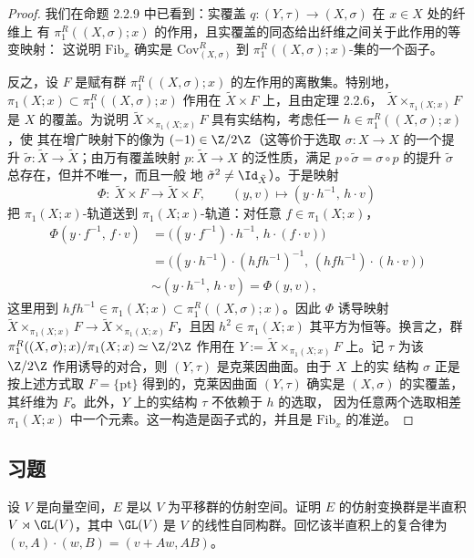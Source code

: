 \begin{proof}
我们在命题 2.2.9 中已看到：实覆盖 $q:(Y,\tau)\to(X,\sigma)$ 在 $x\in X$ 处的纤维上
有 $\pi^R_1((X,\sigma);x)$ 的作用，且实覆盖的同态给出纤维之间关于此作用的等变映射：
这说明 $\mathrm{Fib}_x$ 确实是 $\mathrm{Cov}^R_{(X,\sigma)}$ 到
$\pi^R_1((X,\sigma);x)$-集的一个函子。

反之，设 $F$ 是赋有群 $\pi^R_1((X,\sigma);x)$ 的左作用的离散集。特别地，
$\pi_1(X;x)\subset\pi^R_1((X,\sigma);x)$ 作用在 $\tilde X\times F$ 上，且由定理 2.2.6，
$\tilde X\times_{\pi_1(X;x)}F$ 是 $X$ 的覆盖。为说明
$\tilde X\times_{\pi_1(X;x)}F$ 具有实结构，考虑任一 $h\in\pi^R_1((X,\sigma);x)$，使
其在增广映射下的像为 $(-1)\in\Z/2\Z$（这等价于选取 $\sigma:X\to X$ 的一个提升
$\tilde\sigma:\tilde X\to\tilde X$；由万有覆盖映射 $p:\tilde X\to X$ 的泛性质，满足
$p\circ\tilde\sigma=\sigma\circ p$ 的提升 $\tilde\sigma$ 总存在，但并不唯一，而且一般
地 $\tilde\sigma^2\ne\Id_{\tilde X}$）。于是映射
\[
\Phi:\ \tilde X\times F\longrightarrow\tilde X\times F,
\qquad (y,v)\longmapsto(y\cdot h^{-1},\,h\cdot v)
\]
把 $\pi_1(X;x)$-轨道送到 $\pi_1(X;x)$-轨道：对任意 $f\in\pi_1(X;x)$，
\[
\begin{aligned}
\Phi(y\cdot f^{-1},\,f\cdot v)
&=\bigl((y\cdot f^{-1})\cdot h^{-1},\,h\cdot(f\cdot v)\bigr)\\
&=\bigl((y\cdot h^{-1})\cdot(hfh^{-1})^{-1},\,(hfh^{-1})\cdot(h\cdot v)\bigr)\\
&\sim(y\cdot h^{-1},\,h\cdot v)=\Phi(y,v),
\end{aligned}
\]
这里用到 $hfh^{-1}\in\pi_1(X;x)\subset\pi^R_1((X,\sigma);x)$。因此 $\Phi$ 诱导映射
$\tilde X\times_{\pi_1(X;x)}F\to\tilde X\times_{\pi_1(X;x)}F$，且因 $h^2\in\pi_1(X;x)$
其平方为恒等。换言之，群
$\pi^R_1((X,\sigma);x)/\pi_1(X;x)\simeq\Z/2\Z$ 作用在
$Y:=\tilde X\times_{\pi_1(X;x)}F$ 上。记 $\tau$ 为该 $\Z/2\Z$ 作用诱导的对合，则
$(Y,\tau)$ 是克莱因曲面。由于 $X$ 上的实
结构 $\sigma$ 正是按上述方式取 $F=\{\mathrm{pt}\}$ 得到的，克莱因曲面 $(Y,\tau)$ 确实是
$(X,\sigma)$ 的实覆盖，其纤维为 $F$。此外，$Y$ 上的实结构 $\tau$ 不依赖于 $h$ 的选取，
因为任意两个选取相差 $\pi_1(X;x)$ 中一个元素。这一构造是函子式的，并且是
$\mathrm{Fib}_x$ 的准逆。
\end{proof}

\subsection*{习题}

\begin{exercise}\label{ex:2.2.22}
设 $V$ 是向量空间，$E$ 是以 $V$ 为平移群的仿射空间。证明 $E$ 的仿射变换群是半直积
$V\rtimes\GL(V)$，其中 $\GL(V)$ 是 $V$ 的线性自同构群。回忆该半直积上的复合律为
$(v,A)\cdot(w,B)=(v+Aw,AB)$。
\end{exercise}

